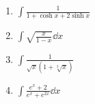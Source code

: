 \documentclass[a4paper, 12pt]{scrartcl}
\begin{document}
\begin{enumerate}
\begin{enumerate}
          \item $\displaystyle
                  \int \frac{1}{1 + \cosh x + 2 \sinh x}
                $

          \item $\displaystyle
                  \int \sqrt{\frac{x}{1 - x}} \dd x
                $

          \item $\displaystyle
                  \int \frac{1}{\sqrt x (1 + \sqrt[3] x)}
                $

          \item $\displaystyle
                  \int \frac{e^x + 2}{e^x + e^{2x}} \dd x
                $
        \end{enumerate}
\end{enumerate}

\end{document}
